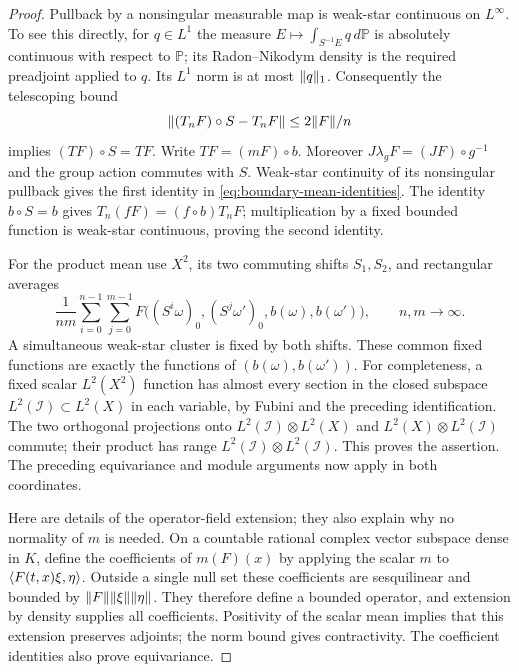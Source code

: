 \begin{proof}
Pullback by a nonsingular measurable map is weak-star continuous on
$L^\infty$.  To see this directly, for $q\in L^1$ the measure
$E\mapsto\int_{S^{-1}E}q\,d\mathbb P$ is absolutely continuous with
respect to $\mathbb P$; its Radon--Nikodym density is the required
preadjoint applied to $q$.  Its $L^1$ norm is at most $\lVert q\rVert_1$.
Consequently the telescoping bound
\[
 \lVert(T_nF)\circ S-T_nF\rVert\le 2\lVert F\rVert/n
\]
implies $(TF)\circ S=TF$.  Write $TF=(mF)\circ b$.
Moreover $J\lambda_g F=(JF)\circ g^{-1}$ and the group action commutes
with $S$.  Weak-star continuity of its nonsingular pullback gives the
first identity in \eqref{eq:boundary-mean-identities}.  The identity
$b\circ S=b$ gives $T_n(fF)=(f\circ b)T_nF$; multiplication by a fixed
bounded function is weak-star continuous, proving the second identity.

For the product mean use $X^2$, its two commuting shifts $S_1,S_2$,
and rectangular averages
\[
 \frac1{nm}\sum_{i=0}^{n-1}\sum_{j=0}^{m-1}
 F\bigl((S^i\omega)_0,(S^j\omega')_0,b(\omega),b(\omega')\bigr),
 \qquad n,m\longrightarrow\infty.
\]
A simultaneous weak-star cluster is fixed by both shifts.  These common
fixed functions are exactly the functions of $(b(\omega),b(\omega'))$.
For completeness, a fixed scalar $L^2(X^2)$ function has almost every
section in the closed subspace $L^2(\mathcal I)\subset L^2(X)$ in
each variable, by Fubini and the preceding identification.  The two
orthogonal projections onto
$L^2(\mathcal I)\otimes L^2(X)$ and
$L^2(X)\otimes L^2(\mathcal I)$ commute; their product has range
$L^2(\mathcal I)\otimes L^2(\mathcal I)$.  This proves the assertion.
The preceding equivariance and module arguments now apply in both
coordinates.

Here are details of the operator-field extension; they also explain why
no normality of $m$ is needed.  On a countable rational complex vector
subspace dense in $K$, define the coefficients of $m(F)(x)$ by applying
the scalar $m$ to $\langle F(t,x)\xi,\eta\rangle$.  Outside a single null set
these coefficients are sesquilinear and bounded by
$\lVert F\rVert\lVert\xi\rVert\lVert\eta\rVert$.  They therefore define a bounded
operator, and extension by density supplies all coefficients.
Positivity of the scalar mean implies that this extension preserves
adjoints; the norm bound gives contractivity.  The coefficient
identities also prove equivariance.


\end{proof}
